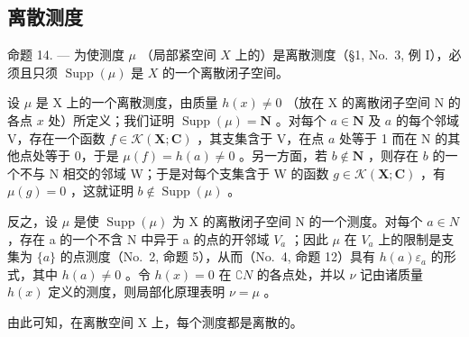 \subsection{离散测度}

命题 14. --- 为使测度 \(\mu\) （局部紧空间 \(X\) 上的）是离散测度（§1, No.~3, 例 I），必须且只须 \(\operatorname{Supp}(\mu)\) 是 \(X\) 的一个离散闭子空间。

设 \(\mu\) 是 X 上的一个离散测度，由质量 \(h(x) \neq 0\) （放在 X 的离散闭子空间 N 的各点 \(x\) 处）所定义；我们证明 \(\operatorname{Supp}(\mu) = \mathbf{N}\) 。对每个 \(a \in \mathbf{N}\) 及 \(a\) 的每个邻域 V，存在一个函数 \(f \in \mathcal{K}(\mathbf{X}; \mathbf{C})\) ，其支集含于 V，在点 \(a\) 处等于 1 而在 N 的其他点处等于 0，于是 \(\mu(f) = h(a) \neq 0\) 。另一方面，若 \(b \notin \mathbf{N}\) ，则存在 \(b\) 的一个不与 N 相交的邻域 W；于是对每个支集含于 W 的函数 \(g \in \mathcal{K}(\mathbf{X}; \mathbf{C})\) ，有 \(\mu(g) = 0\) ，这就证明 \(b \notin \operatorname{Supp}(\mu)\) 。

反之，设 \(\mu\) 是使 \(\operatorname{Supp}(\mu)\) 为 X 的离散闭子空间 N 的一个测度。对每个 \(a \in N\) ，存在 a 的一个不含 N 中异于 a 的点的开邻域 \(V_{a}\) ；因此 \(\mu\) 在 \(V_{a}\) 上的限制是支集为 \(\{a\}\) 的点测度（No.~2, 命题 5），从而（No.~4, 命题 12）具有 \(h(a)\varepsilon_{a}\) 的形式，其中 \(h(a)\neq0\) 。令 \(h(x)=0\) 在 \(\complement N\) 的各点处，并以 \(\nu\) 记由诸质量 \(h(x)\) 定义的测度，则局部化原理表明 \(\nu=\mu\) 。

由此可知，在离散空间 X 上，每个测度都是离散的。

